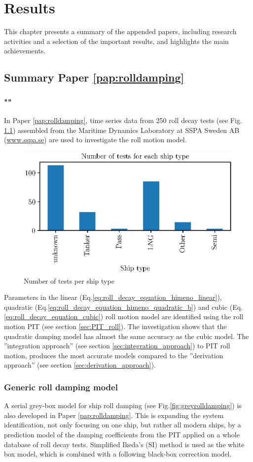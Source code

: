 \chapter{Results\label{ch:results}}
This chapter presents a summary of the appended papers, including research activities
and a selection of the important results, and highlights the main achievements.

\section{Summary Paper \ref{pap:rolldamping}}
\subsection*{""}
In Paper \ref{pap:rolldamping}, time series data from 250 roll decay tests (see Fig. \ref{fig:ship_types}) assembled from the Maritime Dynamics Laboratory at SSPA Sweden AB (\href{www.sspa.se}{www.sspa.se}) are used to investigate the roll motion model. 

\begin{figure}[H]
    \centering
    \includegraphics[width=0.5\columnwidth]{kappa/images/ship_types.eps}
    \caption{Number of tests per ship type}
    \label{fig:ship_types}
\end{figure}

\noindent Parameters in the linear (Eq.\ref{eq:roll_decay_equation_himeno_linear}), quadratic (Eq.\ref{eq:roll_decay_equation_himeno_quadratic_b}) and cubic (Eq.\ref{eq:roll_decay_equation_cubic}) roll motion model are identified using the roll motion PIT (see section \ref{sec:PIT_roll}). The investigation shows that the quadratic damping model has almost the same accuracy as the cubic model. The ''integration approach'' (see section \ref{sec:integration_approach}) to PIT roll motion, produces the most accurate models compared to the ''derivation approach'' (see section \ref{sec:derivation_approach}).

\subsection{Generic roll damping model}
\label{sec:genericrolldampingmodel}
A serial grey-box model for ship roll damping (see Fig.\ref{fig:greyrolldamping}) is also developed in Paper \ref{pap:rolldamping}. 
This is expanding the system identification, not only focusing on one ship, but rather all modern ships, by a prediction model of the damping coefficients from the PIT applied on a whole database of roll decay tests. 
Simplified Ikeda's (SI) method \cite{kawahara_simple_2011} is used as the white box model, which is combined with a following black-box correction model.

